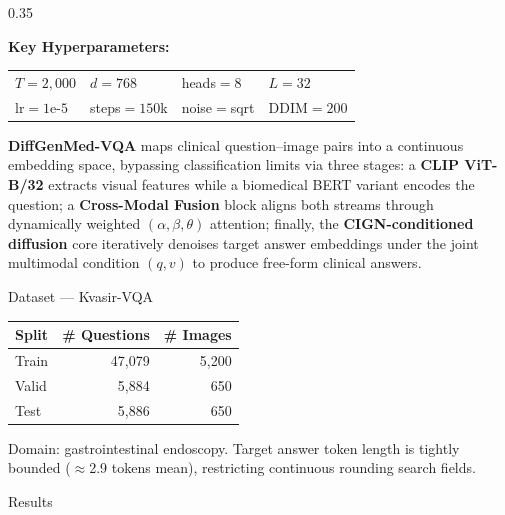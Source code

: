 \documentclass[final]{beamer}
\newcommand{\postersection}[2]{%
  \begin{block}{\LARGE #1}
    \justifying\large #2
  \end{block}
}
\begin{document}
\begin{frame}[t, fragile]
\begin{columns}[t]
\begin{column}{0.35\linewidth}
{    \vspace{0.4em}
    {\large\textbf{Key Hyperparameters:}}
    \vspace{0.3em}
    \begin{center}
    \large
    \begin{tabular}{llll}
      \toprule
      $T{=}2{,}000$ & $d{=}768$ & heads${=}8$ & $L{=}32$ \\
      lr${=}1\text{e-}5$ & steps${=}150$k & noise$=$sqrt & DDIM${=}200$ \\
      \bottomrule
    \end{tabular}
    \end{center}
    
    \vspace{0.4em}
    \textbf{DiffGenMed-VQA} maps clinical question--image pairs into a continuous embedding space, bypassing classification limits via three stages: a \textbf{CLIP ViT-B/32} extracts visual features while a biomedical BERT variant encodes the question; a \textbf{Cross-Modal Fusion} block aligns both streams through dynamically weighted $(\alpha,\beta,\theta)$ attention; finally, the \textbf{CIGN-conditioned diffusion} core iteratively denoises target answer embeddings under the joint multimodal condition $(q, v)$ to produce free-form clinical answers.
  }
  
\postersection{Dataset — Kvasir-VQA}{%
  \begin{center}
  \large
  \renewcommand{\arraystretch}{0.8}
  \begin{tabular}{lrr}
    \toprule
    \textbf{Split} & \textbf{\# Questions} & \textbf{\# Images} \\
    \midrule
    Train & 47,079 & 5,200 \\
    Valid &  5,884 &   650 \\
    Test  &  5,886 &   650 \\
    \bottomrule
  \end{tabular}
  \end{center}

  \vspace{0.2em}
  \large
  Domain: gastrointestinal endoscopy. Target answer token length is tightly bounded ($\approx$2.9 tokens mean), restricting continuous rounding search fields.
}

  \vspace{0.5cm}

  \postersection{Results}{%

}
\end{column}
\end{columns}
\end{frame}
\end{document}

